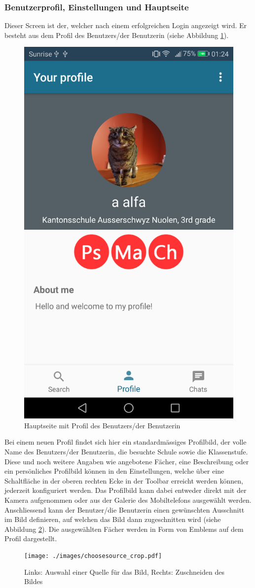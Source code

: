 \documentclass[../main.tex]{subfiles}
\begin{document}
\subsubsection*{Benutzerprofil, Einstellungen und Hauptseite} 
Dieser Screen ist der, welcher nach einem erfolgreichen Login angezeigt wird. Er besteht aus dem Profil des Benutzers/der Benutzerin (siehe Abbildung \ref{mainpage}). 
\begin{figure} 
	\centering
	\includegraphics[width=0.45\linewidth]{./images/mainpage.png}
	\caption{Hauptseite mit Profil des Benutzers/der Benutzerin}
	\label{mainpage}
\end{figure}
Bei einem neuen Profil findet sich hier ein standardmässiges Profilbild, der volle Name des Benutzers/der Benutzerin, die besuchte Schule sowie die Klassenstufe. Diese und noch weitere Angaben wie angebotene Fächer, eine Beschreibung oder ein persönliches Profilbild können in den Einstellungen, welche über eine Schaltfläche in der oberen rechten Ecke in der Toolbar erreicht werden können, jederzeit konfiguriert werden. Das Profilbild kann dabei entweder direkt mit der Kamera aufgenommen oder aus der Galerie des Mobiltelefons ausgewählt werden. Anschliessend kann der Benutzer/die Benutzerin einen gewünschten Ausschnitt im Bild definieren, auf welchen das Bild dann zugeschnitten wird (siehe Abbildung \ref{choose_crop}). Die ausgewählten Fächer werden in Form von Emblems auf dem Profil dargestellt.
\begin{figure} 
	\centering
	\texttt{[image: ./images/choosesource\_crop.pdf]}
	\caption{Links: Auswahl einer Quelle für das Bild, Rechts: Zuschneiden des Bildes}
	\label{choose_crop}
\end{figure}
\end{document}
